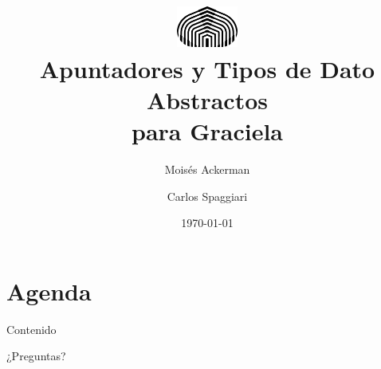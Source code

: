 \documentclass{beamer}
\title[Graciela]{\includegraphics[width=2cm]{usb} \\Apuntadores y Tipos de Dato Abstractos \\ para Graciela}
\author[Ackerman - Spaggiari]{Moisés Ackerman \and Carlos Spaggiari}
\institute[USB]{\large\bfseries{Universidad Simón Bolívar}}
\date{\today{}}
\begin{document}
\begin{frame}
  \titlepage
\end{frame}


\section*{Agenda}
\begin{frame}{Contenido}
  \tableofcontents
\end{frame}








\begin{frame}[c]{\empty}
\begin{center}
\Huge{¿Preguntas?}
\end{center}
\end{frame}
\end{document}
